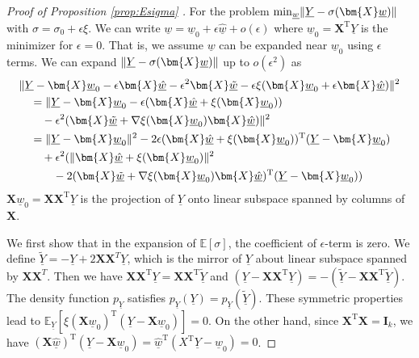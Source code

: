 \documentclass[conference]{IEEEtran}
\DeclarePairedDelimiter\norm{\lVert}{\rVert}
\def\E{\mathbb{E}}
\def\T{\mathrm{T}}
\begin{document}
\begin{proof}[Proof of Proposition \ref{prop:Esigma} ]
For the problem $\min_{\underline{w}} \norm{\underline{Y} - \sigma(\bm{X} \underline{w})}$
with $\sigma = \sigma_0 + \epsilon \xi$. We can write $\underline{w} = \underline{w}_0
+ \epsilon \underline{\hat{w}} + o(\epsilon)$ where $\underline{w}_0 = \bm{X}^\T \underline{Y}$ is the minimizer for
$\epsilon = 0$. That is, we assume $\underline{w}$ can be expanded near $\underline{w}_0$
using $\epsilon$ terms. We can expand $\norm{\underline{Y} - \sigma(\bm{X} \underline{w})}$ 
up to $o(\epsilon^2)$ as
\begin{align*}
&\norm{\underline{Y} - \bm{X} \underline{w}_0 - \epsilon \bm{X} \underline{\hat{w}} -
\epsilon^2 \bm{X} \underline{\tilde{w}} - \epsilon \xi(\bm{X} \underline{w}_0 +
\epsilon \bm{X} \underline{\hat{w}}) }^2 \\
&\quad=  \norm{ \underline{Y} - \bm{X}  \underline{w}_0 -
\epsilon (\bm{X}\underline{\hat{w}} + \xi(\bm{X} \underline{w}_0 )) \\
&\qquad-  \epsilon^2(\bm{X}\underline{\tilde{w}} + \nabla \xi(\bm{X} \underline{w}_0 )\bm{X}\underline{\hat{w}})}^2 \\
&\quad=  \norm{\underline{Y}-\bm{X} \underline{w}_0  }^2 -
2 \epsilon (\bm{X} \underline{\hat{w}} +
\xi(\bm{X} \underline{w}_0))^\T (\underline{Y} - \bm{X} \underline{w}_0) \\
& \qquad+  \epsilon^2(\norm{\bm{X}\underline{\hat{w}} + \xi(\bm{X} \underline{w}_0)}^2 \\
& \qquad\quad -
2 (\bm{X} \underline{\tilde{w}}+
\nabla \xi(\bm{X} \underline{w}_0)\bm{X}\underline{\hat{w}})^\T(\underline{Y}-\bm{X} \underline{w}_0))
\end{align*}
$\bm{X}\underline{w}_0 = \bm{X}\bm{X}^\T \underline{Y}$ is the projection of $\underline{Y}$ onto linear subspace spanned by
columns of $\bm{X}$.

We first show that in the expansion of $\E[\sigma]$, the coefficient of $\epsilon$-term is zero.
We define $\tilde{\underline{Y}} = -\underline{Y} + 2\bm{X}\bm{X}^T\underline{Y}$, which is
the mirror of $\underline{Y}$ about linear subspace spanned by $\bm{X}\bm{X}^T$.
Then we have
$\bm{X}\bm{X}^\T \underline{Y} = \bm{X}\bm{X}^\T \tilde{\underline{Y}}$ and
$(\underline{Y}- \bm{X}\bm{X}^\T\underline{Y}) = -(\tilde{\underline{Y}} - \bm{X}\bm{X}^\T \tilde{\underline{Y}})$.
The density function $p_{\underline{Y}}$ satisfies $p_{\underline{Y}}(\underline{Y})=p_{\underline{Y}}(\tilde{\underline{Y}})$.
These symmetric properties lead to $\E_{\underline{Y}}[\xi(\bm{X}\underline{w}_0)^\T (\underline{Y}-\bm{X}\underline{w}_0)]=0$.
On the other hand, since $\bm{X}^\T \bm{X} = \mathbf{I}_k$,
we have
$(\bm{X}\underline{\hat{w}})^\T (\underline{Y}-\bm{X}\underline{w}_0) = \underline{\hat{w}}^\T (X^\T \underline{Y} - \underline{w}_0) = 0$.


\end{proof}
\end{document}

